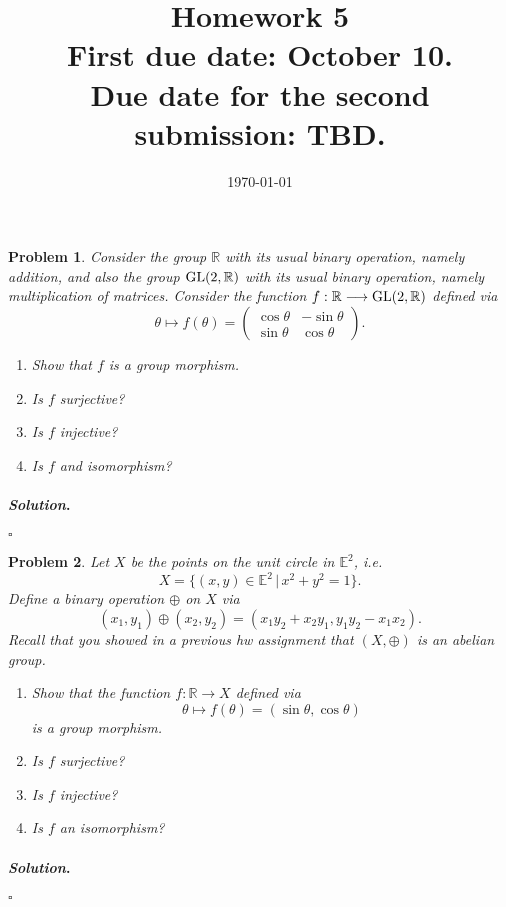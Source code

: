 \documentclass[reqno]{amsart}
\theoremstyle{plain}
\newtheorem{problem}{Problem}
\theoremstyle{definition}
\newenvironment{solution}{\paragraph{\emph{Solution}.}}{\hfill$\square$}
\begin{document}
 

\title[Homework 5]{Homework 5 \\ First due date: October 10.  \\  Due date for the second submission:  TBD.}

\date{\today} 
\maketitle 



\begin{problem}
Consider the group $\mathbb{R}$ with its usual binary operation, namely addition, and also the group ${\rm GL}(2,\mathbb{R})$ with its usual binary operation, namely multiplication of matrices.  Consider the function $f:\mathbb{R} \longrightarrow {\rm GL}(2,\mathbb{R})$ defined via
$$\theta \mapsto f(\theta) =\begin{pmatrix} \cos \theta & -\sin \theta \\ \sin \theta & \cos \theta \end{pmatrix}. $$
\begin{enumerate}
\item Show that $f$ is a group morphism.
\item Is $f$ surjective?
\item Is $f$ injective?
\item Is $f$ and isomorphism?
\end{enumerate}
\end{problem}
\begin{solution}

\end{solution}

\begin{problem}
Let $X$ be the points on the unit circle in $\mathbb{E}^{2}$, i.e.
$$X = \{(x,y) \in \mathbb{E}^{2} \, | \, x^{2} + y^{2} = 1 \}. $$
Define a binary operation $\oplus$ on $X$ via
$$(x_{1},y_{1}) \oplus (x_{2},y_{2}) = (x_{1}y_{2} + x_{2}y_{1},y_{1}y_{2} - x_{1}x_{2}). $$
Recall that you showed in a previous hw assignment that $(X,\oplus)$ is an abelian group.
\begin{enumerate}
\item Show that the function $f:\mathbb{R} \longrightarrow X$ defined via
$$\theta \mapsto f(\theta) = (\sin\theta,\cos \theta) $$
is a group morphism.
\item Is $f$ surjective?
\item Is $f$ injective?
\item Is $f$ an isomorphism?
\end{enumerate}
\end{problem}
\begin{solution}

\end{solution}
\end{document}
